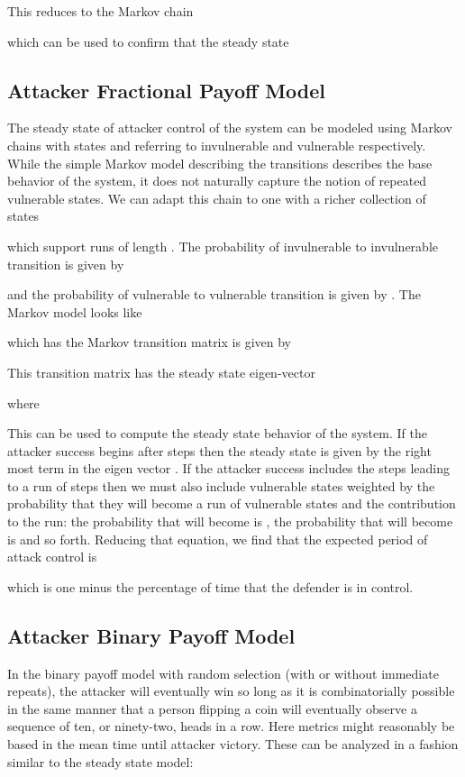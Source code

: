 \documentclass{acm_proc_article-sp}
\begin{document}
This reduces to the Markov chain

which can be used to confirm that the steady state 


\subsection{Attacker Fractional Payoff Model}

The steady state of attacker control of the system can be modeled
using Markov chains with states  and  referring to invulnerable and vulnerable respectively. While the simple Markov model describing the
transitions  describes
the base behavior of the system, it does not naturally capture the
notion of repeated vulnerable states. We can adapt this chain to one
with a richer collection of states 
{\small

}
which support runs of length . The probability of invulnerable
to invulnerable transition is given by 

 and the probability of vulnerable to vulnerable transition is given
by
.
The Markov model looks like


which has the  Markov transition matrix is given by


This transition matrix has the steady state eigen-vector
{\small

}
where
 

This can be used to compute the steady state behavior of the system.
If the attacker success begins after  steps then the steady state
is given by the right most term in the eigen vector .
If the attacker success includes the steps leading to a run of 
steps then we must also include vulnerable states weighted by the
probability that they will become a run of  vulnerable states
and the contribution to the run: the probability that  will
become is , the probability that  will become
is  and so forth. Reducing that equation,
we find that the expected period of attack control  is 

which is one minus the percentage of time that the defender is in control.


\subsection{Attacker Binary Payoff Model}
\label{ABPM}

In the binary payoff model with random selection (with or without immediate
repeats), the attacker will eventually win so long as it is combinatorially
possible in the same manner that a person flipping a coin will eventually
observe a sequence of ten, or ninety-two, heads in a row. Here metrics
might reasonably be based in the mean time until attacker victory.
These can be analyzed in a fashion similar to the steady state model:
\end{document}
